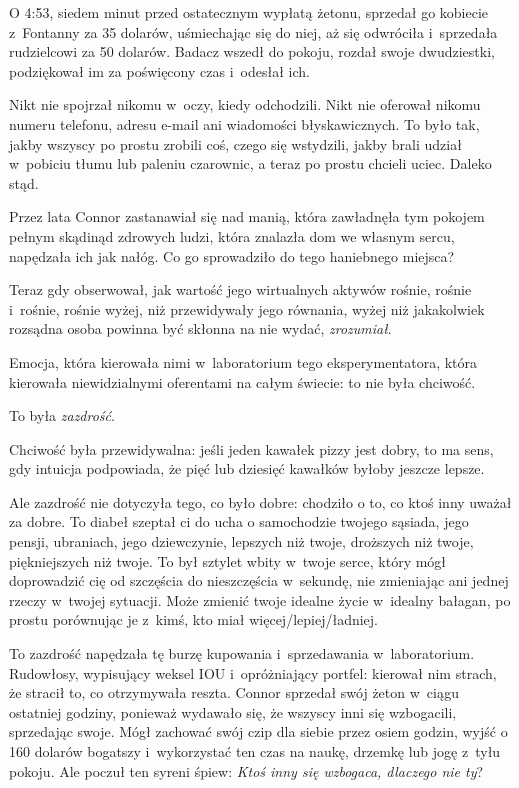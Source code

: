 \documentclass[oneside,polish,11pt,rmheadings]{mwbk}
\begin{document}
O 4:53, siedem minut przed ostatecznym wypłatą żetonu, sprzedał go kobiecie z~Fontanny za 35 dolarów, uśmiechając się do niej, aż się odwróciła i~sprzedała rudzielcowi za 50 dolarów. Badacz wszedł do pokoju, rozdał swoje dwudziestki, podziękował im za poświęcony czas i~odesłał ich.

Nikt nie spojrzał nikomu w~oczy, kiedy odchodzili. Nikt nie oferował nikomu numeru telefonu, adresu e-mail ani wiadomości błyskawicznych. To było tak, jakby wszyscy po prostu zrobili coś, czego się wstydzili, jakby brali udział w~pobiciu tłumu lub paleniu czarownic, a teraz po prostu chcieli uciec. Daleko stąd.

Przez lata Connor zastanawiał się nad manią, która zawładnęła tym pokojem pełnym skądinąd zdrowych ludzi, która znalazła dom we własnym sercu, napędzała ich jak nałóg. Co go sprowadziło do tego haniebnego miejsca?

Teraz gdy obserwował, jak wartość jego wirtualnych aktywów rośnie, rośnie i~rośnie, rośnie wyżej, niż przewidywały jego równania, wyżej niż jakakolwiek rozsądna osoba powinna być skłonna na nie wydać, \textit{zrozumiał}.

Emocja, która kierowała nimi w~laboratorium tego eksperymentatora, która kierowała niewidzialnymi oferentami na całym świecie: to nie była chciwość.

To była \textit{zazdrość}.

Chciwość była przewidywalna: jeśli jeden kawałek pizzy jest dobry, to ma sens, gdy intuicja podpowiada, że pięć lub dziesięć kawałków byłoby jeszcze lepsze.

Ale zazdrość nie dotyczyła tego, co było dobre: chodziło o to, co ktoś inny uważał za dobre. To diabeł szeptał ci do ucha o samochodzie twojego sąsiada, jego pensji, ubraniach, jego dziewczynie, lepszych niż twoje, droższych niż twoje, piękniejszych niż twoje. To był sztylet wbity w~twoje serce, który mógł doprowadzić cię od szczęścia do nieszczęścia w~sekundę, nie zmieniając ani jednej rzeczy w~twojej sytuacji. Może zmienić twoje idealne życie w~idealny bałagan, po prostu porównując je z~kimś, kto miał więcej/lepiej/ładniej.

To zazdrość napędzała tę burzę kupowania i~sprzedawania w~laboratorium. Rudowłosy, wypisujący weksel IOU i~opróżniający portfel: kierował nim strach, że stracił to, co otrzymywała reszta. Connor sprzedał swój żeton w~ciągu ostatniej godziny, ponieważ wydawało się, że wszyscy inni się wzbogacili, sprzedając swoje. Mógł zachować swój czip dla siebie przez osiem godzin, wyjść o 160 dolarów bogatszy i~wykorzystać ten czas na naukę, drzemkę lub jogę z~tyłu pokoju. Ale poczuł ten syreni śpiew: \textit{Ktoś inny się wzbogaca, dlaczego nie ty}? 
\end{document}
